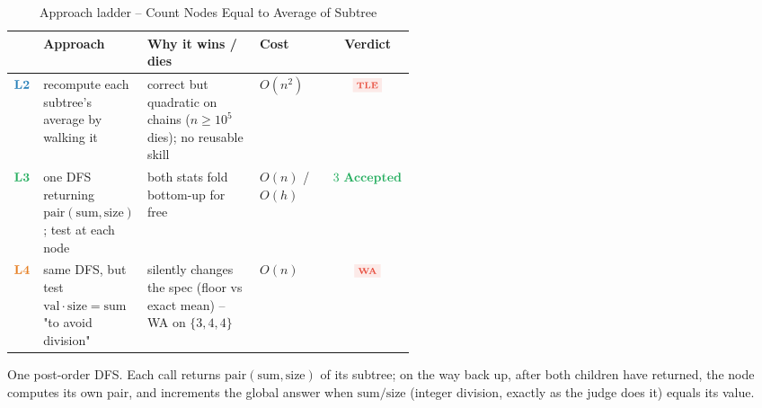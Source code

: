 \begin{thinkbox}
\end{thinkbox}

\begin{table}[H]\centering\small
\caption*{Approach ladder -- Count Nodes Equal to Average of Subtree}
\begin{tabular}{@{}c p{0.235\linewidth} p{0.28\linewidth} l c@{}}
\toprule
& \textbf{Approach} & \textbf{Why it wins / dies} & \textbf{Cost} & \textbf{Verdict}\\
\midrule
$\lv2$ & recompute each subtree's average by walking it
  & correct but quadratic on chains ($n\ge10^5$ dies); no reusable skill
  & $O(n^2)$ & $\colorbox{warningred!12}{\textcolor{warningred}{\scriptsize\bfseries TLE}}$\\
\addlinespace
$\lv3$ & one DFS returning $\mathrm{pair}(\mathrm{sum},\mathrm{size})$; test at each node
  & both stats fold bottom-up for free
  & $O(n)$ / $O(h)$ & $\ac$\\
\addlinespace
$\lv4$ & same DFS, but test $\mathrm{val}\cdot\mathrm{size}=\mathrm{sum}$ "to avoid division"
  & silently changes the spec (floor vs exact mean) -- WA on $\{3,4,4\}$
  & $O(n)$ & $\colorbox{warningred!12}{\textcolor{warningred}{\scriptsize\bfseries WA}}$\\
\bottomrule
\end{tabular}
\end{table}

One post-order DFS. Each call returns $\mathrm{pair}(\mathrm{sum},\mathrm{size})$ of its
subtree; on the way back up, after both children have returned, the node computes its own
pair, and increments the global answer when $\mathrm{sum}/\mathrm{size}$ (integer
division, exactly as the judge does it) equals its value.

